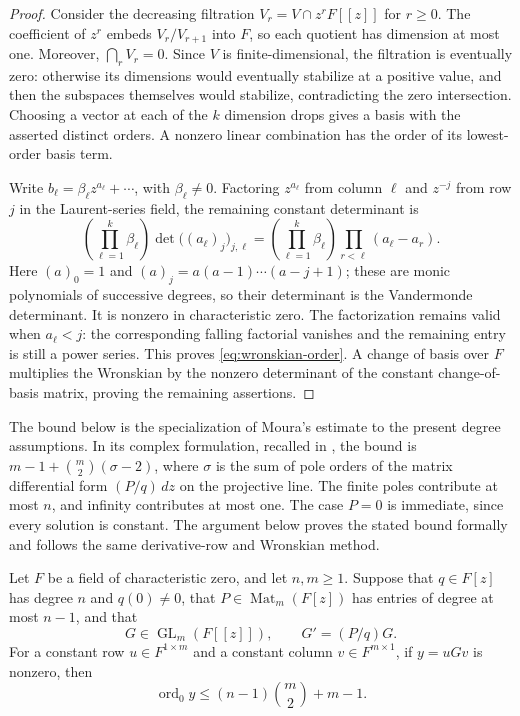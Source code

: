 \begin{proof}
Consider the decreasing filtration $V_r=V\cap z^rF[[z]]$ for $r\ge0$.
The coefficient of $z^r$ embeds $V_r/V_{r+1}$ into $F$, so each quotient
has dimension at most one.  Moreover, $\bigcap_r V_r=0$.  Since $V$ is
finite-dimensional, the filtration is eventually zero: otherwise its
dimensions would eventually stabilize at a positive value, and then the
subspaces themselves would stabilize, contradicting the zero
intersection.  Choosing a vector at each of the $k$ dimension drops
gives a basis with the asserted distinct orders.  A nonzero linear
combination has the order of its lowest-order basis term.

Write $b_\ell=\beta_\ell z^{a_\ell}+\cdots$, with
$\beta_\ell\ne0$.  Factoring $z^{a_\ell}$ from column $\ell$ and $z^{-j}$
from row $j$ in the Laurent-series field, the remaining constant
determinant is
\[
 \left(\prod_{\ell=1}^k\beta_\ell\right)
 \det\bigl((a_\ell)_j\bigr)_{j,\ell}
 =\left(\prod_{\ell=1}^k\beta_\ell\right)
   \prod_{r<\ell}(a_\ell-a_r).
\]
Here $(a)_0=1$ and $(a)_j=a(a-1)\cdots(a-j+1)$; these are monic
polynomials of successive degrees, so their determinant is the
Vandermonde determinant.  It is nonzero in characteristic zero.  The
factorization remains valid when $a_\ell<j$: the corresponding falling
factorial vanishes and the remaining entry is still a power series.
This proves \eqref{eq:wronskian-order}.  A change of basis over $F$
multiplies the Wronskian by the nonzero determinant of the constant
change-of-basis matrix, proving the remaining assertions.
\end{proof}

The bound below is the specialization of Moura's estimate to the present
degree assumptions. In its complex formulation, recalled in
\cite[Section~2, Theorem~1]{MouraHyperelliptic2003}, the bound is
$m-1+\binom m2(\sigma-2)$, where $\sigma$ is the sum of pole orders
of the matrix differential form $(P/q)\,dz$ on the projective line.
The finite poles contribute at most $n$, and infinity contributes at
most one. The case $P=0$ is immediate, since every solution is constant.
The argument below proves the stated bound formally and follows the
same derivative-row and Wronskian method.

\begin{theorem}\label{thm:multiplicity}
Let $F$ be a field of characteristic zero, and let $n,m\ge1$.
Suppose that $q\in F[z]$ has degree $n$ and $q(0)\ne0$, that
$P\in\operatorname{Mat}_m(F[z])$ has entries of degree at most $n-1$,
and that
\[
 G\in\operatorname{GL}_m(F[[z]]),\qquad G'=(P/q)G.
\]
For a constant row $u\in F^{1\times m}$ and a constant column
$v\in F^{m\times1}$, if $y=uGv$ is nonzero, then
\begin{equation}\label{eq:multiplicity-bound}
 \operatorname{ord}_0 y\le(n-1)\binom{m}{2}+m-1.
\end{equation}
\end{theorem}

